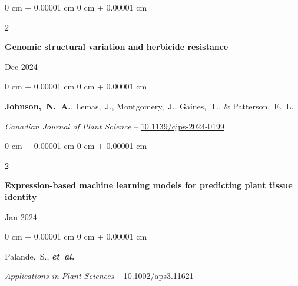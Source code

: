 \documentclass[10pt, letterpaper]{article}
\newenvironment{onecolentry}{
    \begin{adjustwidth}{
        0 cm + 0.00001 cm
    }{
        0 cm + 0.00001 cm
    }
}{
    \end{adjustwidth}
} %
\newenvironment{twocolentry}[2][]{
    \onecolentry
    \def\secondColumn{#2}
    \setcolumnwidth{\fill, 4.5 cm}
    \begin{paracol}{2}
}{
    \switchcolumn \raggedleft \secondColumn
    \end{paracol}
    \endonecolentry
} %
\begin{document}
        \vspace{0.2 cm}


        \begin{samepage}
            \begin{twocolentry}{
                Dec 2024
                }
                \textbf{Genomic structural variation and herbicide resistance}
            \end{twocolentry}

            \vspace{0.10 cm}
            
            \begin{onecolentry}
                \mbox{\textbf{Johnson, N. A.}}, \mbox{Lemas, J.}, \mbox{Montgomery, J.}, \mbox{Gaines, T.}, \& \mbox{Patterson, E. L.}

                \vspace{0.10 cm}
                
                \textit{Canadian Journal of Plant Science} -- \href{https://doi.org/10.1139/cjps-2024-0199}{10.1139/cjps-2024-0199}
            \end{onecolentry}
        \end{samepage}


        \vspace{0.2 cm}

        
        \begin{samepage}
            \begin{twocolentry}{
                Jan 2024
                }
                \textbf{Expression-based machine learning models for predicting plant tissue identity}
            \end{twocolentry}

            \vspace{0.10 cm}
            
            \begin{onecolentry}
                \mbox{Palande, S.}, \mbox{\textbf{\textit{et al.}}}

                \vspace{0.10 cm}
                
                \textit{Applications in Plant Sciences} -- \href{https://doi.org/10.1002/aps3.11621}{10.1002/aps3.11621}
            \end{onecolentry}
        \end{samepage}


        \vspace{0.2 cm}
        
\end{document}
